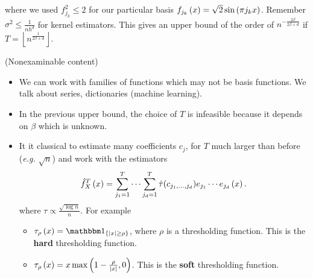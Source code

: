 where we used $f_{j_k}^2 \leq 2$ for our particular basis $f_{j_k}\left(x\right) = \sqrt{2}\sin\left(\pi j_k x\right)$.
Remember $\sigma^2 \leq \frac{1}{nh^d}$ for kernel estimators.
This gives an upper bound of the order of $n^{-\frac{2\beta}{2\beta +d }}$ if $T = \left\lfloor n^{\frac{1}{2\beta + d}}\right\rfloor$.
\begin{remark}(Nonexaminable content)
    \begin{itemize}
        \item We can work with families of functions which may not be basis functions. We talk about series, dictionaries (machine learning).
        \item In the previous upper bound, the choice of $T$ is infeasible because it depends on $\beta$ which is unknown. 
        \item It it classical to estimate many coefficients $c_j$, for $T$ much larger than before (\emph{e.g.} $\sqrt{n}$) and work with the estimators\begin{equation*}
            \hat f_X^T\left(x\right) = \sum_{j_1=1}^T \cdots \sum_{j_d=1}^T \hat \tau(c_{j_1,...,j_d}) e_{j_1}\cdots e_{j_d}\left(x\right).
        \end{equation*}
        where $\tau \propto \frac{\sqrt{\log n}}{n}$. For example 
        \begin{itemize}
            \item $\tau_\rho \pa{x} = \one_{\set{\abs{x}\geq \rho}}$, where $\rho$ is a thresholding function. This is the \textbf{hard} thresholding function.
            \item $\tau_\rho \left(x\right) = x \max \left(1-\frac{\rho}{\left| x\right|},0\right)$. This is the \textbf{soft} thresholding function.
            \end{itemize}
    \end{itemize}

     
\end{remark}